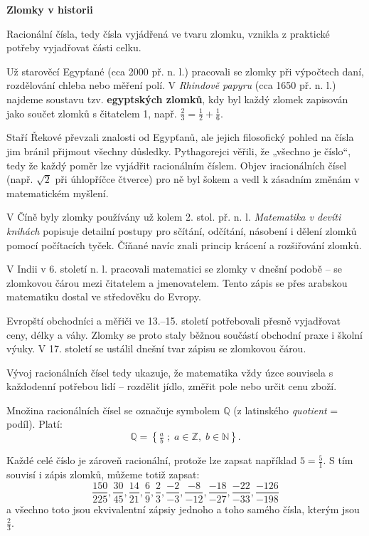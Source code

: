 \documentclass[12pt,a4paper]{article}
\begin{document}
\begin{historicalbox}
\textbf{Zlomky v historii}  

Racionální čísla, tedy čísla vyjádřená ve tvaru zlomku, vznikla z praktické potřeby vyjadřovat části celku.  

Už starověcí Egypťané (cca 2000 př. n. l.) pracovali se zlomky při výpočtech daní, rozdělování chleba nebo měření polí. 
V \textit{Rhindově papyru} (cca 1650 př. n. l.) najdeme soustavu tzv. \textbf{egyptských zlomků}, kdy byl každý zlomek zapisován 
jako součet zlomků s čitatelem 1, např. $\tfrac{2}{3} = \tfrac{1}{2} + \tfrac{1}{6}$.  

\smallskip
Staří Řekové převzali znalosti od Egypťanů, ale jejich filosofický pohled na čísla jim bránil přijmout všechny důsledky. 
Pythagorejci věřili, že „všechno je číslo“, tedy že každý poměr lze vyjádřit racionálním číslem. Objev iracionálních čísel 
(např. $\sqrt{2}$ při úhlopříčce čtverce) pro ně byl šokem a vedl k zásadním změnám v matematickém myšlení.  

\smallskip
V Číně byly zlomky používány už kolem 2. stol. př. n. l. \textit{Matematika v devíti knihách} popisuje detailní postupy pro 
sčítání, odčítání, násobení i dělení zlomků pomocí počítacích tyček. Číňané navíc znali princip krácení a rozšiřování zlomků.  

V Indii v 6. století n. l. pracovali matematici se zlomky v dnešní podobě – se zlomkovou čárou mezi čitatelem a jmenovatelem.  
Tento zápis se přes arabskou matematiku dostal ve středověku do Evropy.  

\smallskip
Evropští obchodníci a měřiči ve 13.–15. století potřebovali přesně vyjadřovat ceny, délky a váhy. Zlomky se proto staly běžnou 
součástí obchodní praxe i školní výuky. V 17. století se ustálil dnešní tvar zápisu se zlomkovou čárou.  

Vývoj racionálních čísel tedy ukazuje, že matematika vždy úzce souvisela s každodenní potřebou lidí – rozdělit jídlo, změřit pole 
nebo určit cenu zboží.
\end{historicalbox}


Množina racionálních čísel se označuje symbolem $\mathbb{Q}$  (z latinského \textit{quotient} = podíl).  
Platí:
\[
\mathbb{Q} = \left\{ \tfrac{a}{b} \; ; \; a \in \mathbb{Z}, \; b \in \mathbb{N} \right\}.
\]

Každé celé číslo je zároveň racionální, protože lze zapsat například $5=\tfrac{5}{1}$. 
S tím souvisí i zápis zlomků, můžeme totiž zapsat:
\[
 \frac{150}{225},\frac{30}{45},\frac{14}{21},\frac{6}{9},\frac{2}{3},\frac{-2}{-3},\frac{-8}{-12},\frac{-18}{-27},\frac{-22}{-33},\frac{-126}{-198}
\]
a všechno toto jsou ekvivalentní zápsiy jednoho a toho samého čísla, kterým jsou $\frac{2}{3}$.
\end{document}
